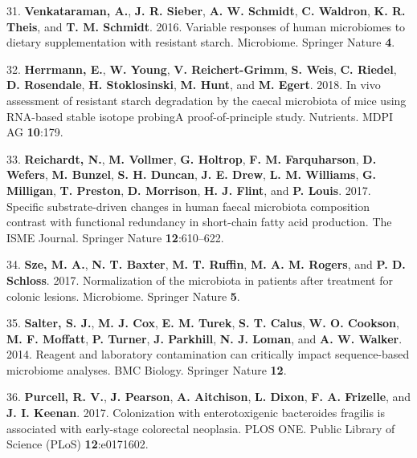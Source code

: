 \documentclass[12pt,]{article}
\begin{document}
\hypertarget{ref-Venkataraman2016}{}
31. \textbf{Venkataraman, A.}, \textbf{J. R. Sieber}, \textbf{A. W.
Schmidt}, \textbf{C. Waldron}, \textbf{K. R. Theis}, and \textbf{T. M.
Schmidt}. 2016. Variable responses of human microbiomes to dietary
supplementation with resistant starch. Microbiome. Springer Nature
\textbf{4}.

\hypertarget{ref-Herrmann2018}{}
32. \textbf{Herrmann, E.}, \textbf{W. Young}, \textbf{V.
Reichert-Grimm}, \textbf{S. Weis}, \textbf{C. Riedel}, \textbf{D.
Rosendale}, \textbf{H. Stoklosinski}, \textbf{M. Hunt}, and \textbf{M.
Egert}. 2018. In vivo assessment of resistant starch degradation by the
caecal microbiota of mice using RNA-based stable isotope probingA
proof-of-principle study. Nutrients. MDPI AG \textbf{10}:179.

\hypertarget{ref-Reichardt2017}{}
33. \textbf{Reichardt, N.}, \textbf{M. Vollmer}, \textbf{G. Holtrop},
\textbf{F. M. Farquharson}, \textbf{D. Wefers}, \textbf{M. Bunzel},
\textbf{S. H. Duncan}, \textbf{J. E. Drew}, \textbf{L. M. Williams},
\textbf{G. Milligan}, \textbf{T. Preston}, \textbf{D. Morrison},
\textbf{H. J. Flint}, and \textbf{P. Louis}. 2017. Specific
substrate-driven changes in human faecal microbiota composition contrast
with functional redundancy in short-chain fatty acid production. The
ISME Journal. Springer Nature \textbf{12}:610--622.

\hypertarget{ref-Sze2017}{}
34. \textbf{Sze, M. A.}, \textbf{N. T. Baxter}, \textbf{M. T. Ruffin},
\textbf{M. A. M. Rogers}, and \textbf{P. D. Schloss}. 2017.
Normalization of the microbiota in patients after treatment for colonic
lesions. Microbiome. Springer Nature \textbf{5}.

\hypertarget{ref-Salter_contamination_2014}{}
35. \textbf{Salter, S. J.}, \textbf{M. J. Cox}, \textbf{E. M. Turek},
\textbf{S. T. Calus}, \textbf{W. O. Cookson}, \textbf{M. F. Moffatt},
\textbf{P. Turner}, \textbf{J. Parkhill}, \textbf{N. J. Loman}, and
\textbf{A. W. Walker}. 2014. Reagent and laboratory contamination can
critically impact sequence-based microbiome analyses. BMC Biology.
Springer Nature \textbf{12}.

\hypertarget{ref-Purcell2017}{}
36. \textbf{Purcell, R. V.}, \textbf{J. Pearson}, \textbf{A. Aitchison},
\textbf{L. Dixon}, \textbf{F. A. Frizelle}, and \textbf{J. I. Keenan}.
2017. Colonization with enterotoxigenic bacteroides fragilis is
associated with early-stage colorectal neoplasia. PLOS ONE. Public
Library of Science (PLoS) \textbf{12}:e0171602.
\end{document}
